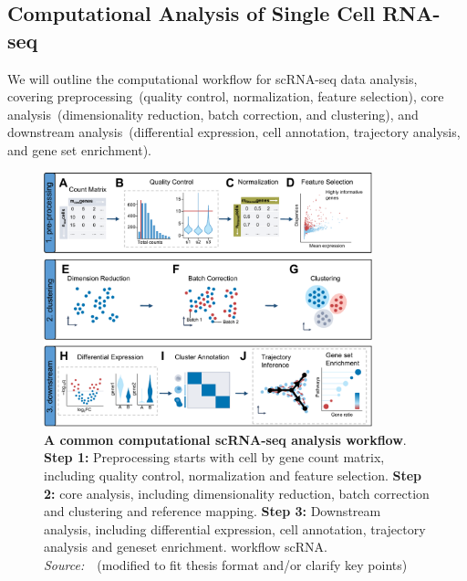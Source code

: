 \subsection{Computational Analysis of Single Cell RNA-seq}
\label{background:sec2:scRNA}
We will outline the computational workflow for scRNA-seq data analysis, covering preprocessing~(quality control, normalization, feature selection), core analysis~(dimensionality reduction, batch correction, and clustering), and downstream analysis~(differential expression, cell annotation, trajectory analysis, and gene set enrichment).

\begin{figure}[!ht]
	\centering
	\includegraphics[width=0.85\textwidth]{workflow_scRNA/fig}
	\vspace{0.1cm}
	\caption[A common computational scRNA-seq analysis workflow]{
		\textbf{A common computational scRNA-seq analysis workflow}.
		\textbf{Step 1:} Preprocessing starts with cell by gene count matrix, including quality control, normalization and feature selection.
		\textbf{Step 2:} core analysis, including dimensionality reduction, batch correction and clustering and reference mapping.
		\textbf{Step 3:} Downstream analysis, including differential expression, cell annotation, trajectory analysis and geneset enrichment.
	workflow scRNA. \emph{Source:~\cite{heumos2023best}}~(modified to fit thesis format and/or clarify key points)}
	\label{fig:workflow_scRNA}
\end{figure}


